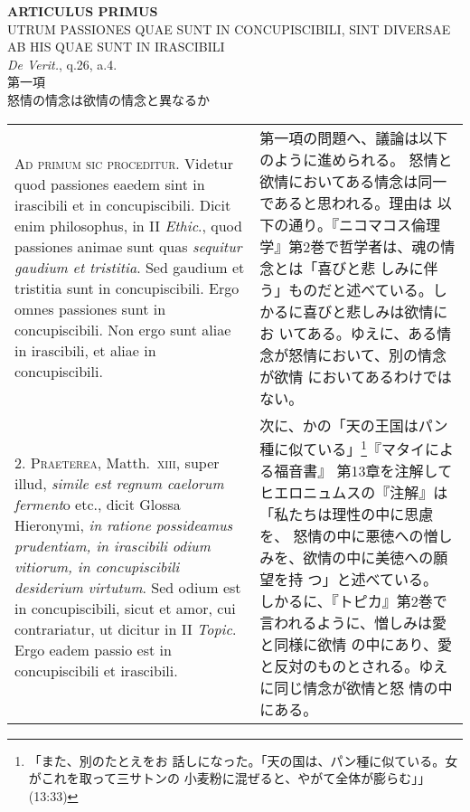 \documentclass[10pt]{jsarticle} %
\begin{document}
\newpage
{}
\begin{center}
{\Large {\bf ARTICULUS PRIMUS}}\\
{\large UTRUM PASSIONES QUAE SUNT IN CONCUPISCIBILI, SINT DIVERSAE AB
 HIS QUAE SUNT IN IRASCIBILI}\\
{\footnotesize {\itshape De Verit.}, q.26, a.4.}\\
{\Large 第一項\\怒情の情念は欲情の情念と異なるか}
\end{center}

\begin{longtable}{p{21em}p{21em}}
{\scshape Ad primum sic proceditur}. Videtur quod passiones eaedem sint in
irascibili et in concupiscibili. Dicit enim philosophus, in II {\itshape Ethic}.,
quod passiones animae sunt quas {\itshape sequitur gaudium et tristitia}. Sed
gaudium et tristitia sunt in concupiscibili. Ergo omnes passiones sunt
in concupiscibili. Non ergo sunt aliae in irascibili, et aliae in
concupiscibili.


&

第一項の問題へ、議論は以下のように進められる。
怒情と欲情においてある情念は同一であると思われる。理由は
 以下の通り。『ニコマコス倫理学』第2巻で哲学者は、魂の情念とは「喜びと悲
 しみに伴う」ものだと述べている。しかるに喜びと悲しみは欲情にお
 いてある。ゆえに、ある情念が怒情において、別の情念が欲情
においてあるわけではない。


\\



2. {\scshape Praeterea}, Matth.~{\scshape xiii}, super illud, {\itshape simile est regnum caelorum ferment}o
etc., dicit Glossa Hieronymi, {\itshape in ratione possideamus prudentiam, in
irascibili odium vitiorum, in concupiscibili desiderium virtutum}. Sed
odium est in concupiscibili, sicut et amor, cui contrariatur, ut dicitur
in II {\itshape Topic}. Ergo eadem passio est in concupiscibili et irascibili.


&

次に、かの「天の王国はパン種に似ている」\footnote{「また、別のたとえをお
 話しになった。「天の国は、パン種に似ている。女がこれを取って三サトンの
 小麦粉に混ぜると、やがて全体が膨らむ」」(13:33)}『マタイによる福音書』
 第13章を注解してヒエロニュムスの『注解』は「私たちは理性の中に思慮を、
 怒情の中に悪徳への憎しみを、欲情の中に美徳への願望を持
 つ」と述べている。
しかるに、『トピカ』第2巻で言われるように、憎しみは愛と同様に欲情
の中にあり、愛と反対のものとされる。ゆえに同じ情念が欲情と怒
 情の中にある。



\end{longtable}
\end{document}
